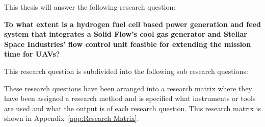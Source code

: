 
This thesis will answer the following research question:

\textbf{To what extent is a hydrogen fuel cell based power generation and feed system that integrates a Solid Flow's cool gas generator and Stellar Space Industries' flow control unit feasible for extending the mission time for UAVs?}


This research question is subdivided into the following sub research questions:

\begin{enumerate}
\end{enumerate}

These research questions have been arranged into a research matrix where they have been assigned a research method and is specified what instruments or tools are used and what the output is of each research question. This research matrix is shown in Appendix~\ref{app:Research Matrix}.

\newpage


